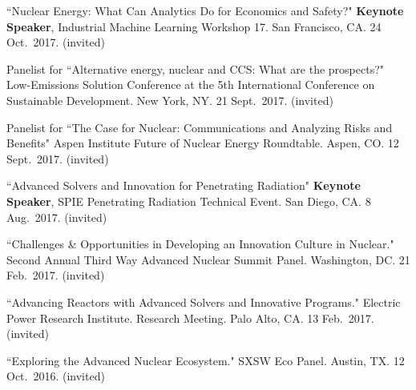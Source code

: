 \begin{bibsection}


\item ``Nuclear Energy: What Can Analytics Do for Economics and Safety?" \textbf{Keynote Speaker}, Industrial Machine Learning Workshop 17. San Francisco, CA. 24 Oct.\ 2017. (invited)

\item Panelist for ``Alternative energy, nuclear and CCS: What are the prospects?" Low-Emissions Solution Conference at the 5th International Conference on Sustainable Development. New York, NY. 21  Sept.\ 2017. (invited)

\item Panelist for ``The Case for Nuclear: Communications and Analyzing Risks and Benefits" Aspen Institute Future of Nuclear Energy Roundtable. Aspen, CO. 12  Sept.\ 2017. (invited)

\item ``Advanced Solvers and Innovation for Penetrating Radiation" \textbf{Keynote Speaker}, SPIE Penetrating Radiation Technical Event. San Diego, CA. 8 Aug.\ 2017. (invited)


\item ``Challenges \& Opportunities in Developing an Innovation Culture in Nuclear." Second Annual Third Way Advanced Nuclear Summit Panel. Washington, DC. 21 Feb.\ 2017. (invited)

\item ``Advancing Reactors with Advanced Solvers and Innovative Programs." Electric Power Research Institute. Research Meeting. Palo Alto, CA. 13 Feb.\ 2017. (invited)

\item ``Exploring the Advanced Nuclear Ecosystem." SXSW Eco Panel. Austin, TX. 12 Oct.\ 2016. (invited)



\end{bibsection}
